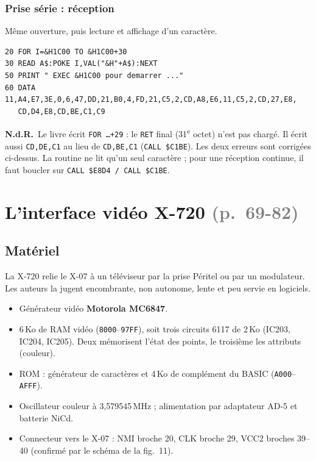 \documentclass[a4paper,10pt]{article}
\newcommand{\hex}[1]{\texttt{#1}}
\newcommand{\pg}[1]{\texorpdfstring{\textcolor{gray}{\small(p.~#1)}}{}}
\newcommand{\nota}[1]{\textcolor{red!60!black}{\small\textbf{N.d.R.}~#1}}
\begin{document}
\subsubsection*{Prise série : réception}
Même ouverture, puis lecture et affichage d'un caractère.
\begin{verbatim}
20 FOR I=&H1C00 TO &H1C00+30
30 READ A$:POKE I,VAL("&H"+A$):NEXT
50 PRINT " EXEC &H1C00 pour demarrer ..."
60 DATA 11,A4,E7,3E,0,6,47,DD,21,B0,4,FD,21,C5,2,CD,A8,E6,11,C5,2,CD,27,E8,
   CD,D4,E8,CD,BE,C1,C9
\end{verbatim}
\nota{Le livre écrit \texttt{FOR \dots +29} : le \texttt{RET} final
(31\textsuperscript{e} octet) n'est pas chargé. Il écrit aussi
\texttt{CD,DE,C1} au lieu de \texttt{CD,BE,C1} (\texttt{CALL \$C1BE}). Les
deux erreurs sont corrigées ci-dessus. La routine ne lit qu'un seul
caractère ; pour une réception continue, il faut boucler sur
\texttt{CALL \$E8D4 / CALL \$C1BE}.}

\section{L'interface vidéo X-720 \pg{69-82}}

\subsection{Matériel}
La X-720 relie le X-07 à un téléviseur par la prise Péritel ou par un
modulateur. Les auteurs la jugent encombrante, non autonome, lente et peu
servie en logiciels.

\begin{itemize}
  \item Générateur vidéo \textbf{Motorola MC6847}.
  \item 6\,Ko de RAM vidéo (\hex{8000}--\hex{97FF}), soit trois circuits
        6117 de 2\,Ko (IC203, IC204, IC205). Deux mémorisent l'état des
        points, le troisième les attributs (couleur).
  \item ROM : générateur de caractères et 4\,Ko de complément du BASIC
        (\hex{A000}--\hex{AFFF}).
  \item Oscillateur couleur à 3,579545\,MHz ; alimentation par adaptateur
        AD-5 et batterie NiCd.
  \item Connecteur vers le X-07 : NMI broche 20, CLK broche 29, VCC2
        broches 39--40 (confirmé par le schéma de la fig.~11).
\end{itemize}
\end{document}
